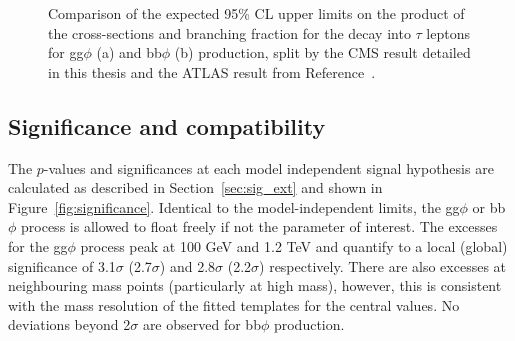 \begin{figure}[!hbtp]
\centering
\caption[Plots of the comparison of the model-independent limits between CMS and ATLAS.]{Comparison of the expected 95\% CL upper limits on the product of the cross-sections and branching fraction for the decay into $\tau$ leptons for gg$\phi$ (a) and bb$\phi$ (b) production, split by the CMS result detailed in this thesis and the ATLAS result from Reference~\cite{ATLAS:2020zms}.}
\label{fig:model_independent_limits_ATLAS}
\end{figure}

\subsection{Significance and compatibility}
\label{sec:sig_and_compat}

The $p$-values and significances at each model independent signal hypothesis are calculated as described in Section~\ref{sec:sig_ext} and shown in Figure~\ref{fig:significance}.
Identical to the model-independent limits, the gg$\phi$ or bb$\phi$ process is allowed to float freely if not the parameter of interest.
The excesses for the gg$\phi$ process peak at 100 GeV and 1.2 TeV and quantify to a local (global) significance of 3.1$\sigma$ (2.7$\sigma$) and 2.8$\sigma$ (2.2$\sigma$) respectively.
There are also excesses at neighbouring mass points (particularly at high mass), however, this is consistent with the mass resolution of the fitted templates for the central values.
No deviations beyond 2$\sigma$ are observed for bb$\phi$ production. \\

